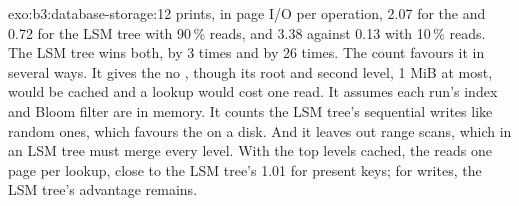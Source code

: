 \begin{solution}{exo:b3:database-storage:12}
 prints, in page I/O per operation, 2.07 for the  and 0.72 for the LSM tree with 90\,\% reads, and 3.38 against 0.13 with 10\,\% reads. The LSM tree wins both, by 3 times and by 26 times. The count favours it in several ways. It gives the  no , though its root and second level, 1 MiB at most, would be cached and a lookup would cost one read. It assumes each run's index and Bloom filter are in memory. It counts the LSM tree's sequential writes like random ones, which favours the  on a disk. And it leaves out range scans, which in an LSM tree must merge every level. With the top levels cached, the  reads one page per lookup, close to the LSM tree's 1.01 for present keys; for writes, the LSM tree's advantage remains.
\end{solution}

